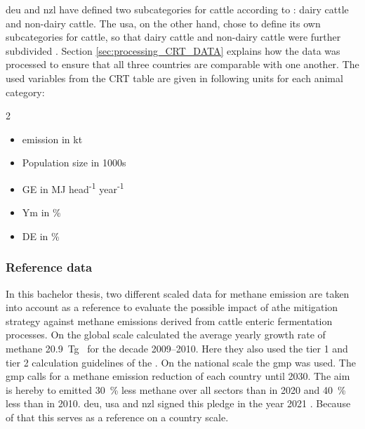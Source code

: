 \acrshort{deu} and \acrshort{nzl} have defined two subcategories for cattle according to \citet{IPCC_2019_Chapter_EnterFE}: dairy cattle and non-dairy cattle. The \acrshort{usa}, on the other hand, chose to define its own subcategories for cattle, so that dairy cattle and non-dairy cattle were further subdivided \parencite{epaInventoryUSGreenhouse2024}. Section \cref{sec:processing_CRT_DATA} explains how the data was processed to ensure that all three countries are comparable with one another.
The used variables from the CRT table are given in following units for each animal category:
\begin{multicols}{2}
	\raggedcolumns %
	\begin{itemize}
		\item {} emission in kt~
		\item Population size in 1000s
		\item \acrshort{GE} in MJ head\textsuperscript{-1} year\textsuperscript{-1}
		\item \acrshort{Ym} in \%
		\item \acrshort{DE} in \%
	\end{itemize}
\end{multicols}

\subsubsection{Reference data}
\label{sec:reference_data}

In this bachelor thesis, two different scaled data for methane emission are taken into account as a reference to evaluate the possible impact of athe mitigation strategy against methane emissions derived from cattle enteric fermentation processes. 
On the global scale \textcite[fig. 7]{saunoisGlobalMethaneBudget2025} calculated the average yearly growth rate of methane 20.9~Tg~ for the decade 2009--2010. Here they also used the tier 1 and tier 2 calculation guidelines of the \textcite{IPCC_2006_complete_Guidline}.  
On the national scale the \acrfull{gmp} was used. The \acrshort{gmp} calls for a methane emission reduction of each country until 2030. The aim is hereby to emitted 30~\% less methane over all sectors than in 2020 and 40~\% less than in 2010. \acrshort{deu}, \acrshort{usa} and \acrshort{nzl} signed this pledge in the year 2021 \parencite{appelhansUnterschatztesTreibhausgasMethan2025, ccacHomepageGlobalMethane}. Because of that this serves as a reference on a country scale.

